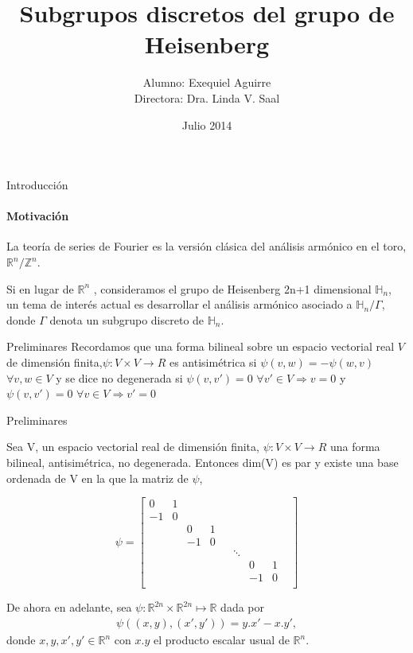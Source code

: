 \documentclass{beamer}
\author{Alumno: Exequiel Aguirre \\ Directora: Dra. Linda V. Saal}
\title{Subgrupos discretos del grupo de Heisenberg }
\date{Julio 2014}
\begin{document}
\maketitle


\begin{frame}{Introducción}
\framesubtitle{Motivación}
La teoría de series de Fourier es la versión clásica del análisis armónico en el toro,
$\mathbb{R}^n /\mathbb{Z}^n$.

Si en lugar de $\mathbb{R}^n$ , consideramos el grupo de Heisenberg 2n+1 dimensional $\mathbb{H}_n$, un tema
de interés actual es desarrollar el análisis armónico asociado a $\mathbb{H}_n/\Gamma$, donde $\Gamma$ 
denota un subgrupo discreto de $\mathbb{H}_n$. 
\end{frame}


\begin{frame}{Preliminares}
Recordamos que una forma bilineal sobre un espacio vectorial real $V$ de dimensión finita,$\psi :V\times V\rightarrow R$
es antisimétrica si $\psi(v,w)=-\psi(w,v)$ $\forall v,w \in V$  y se dice no degenerada si 
$\psi(v,v')=0$ $\forall v' \in V \Rightarrow v = 0$  y 
$\psi(v,v')=0$ $\forall v \in V \Rightarrow v' = 0$
\end{frame}

\begin{frame}{Preliminares}
\begin{theorem} \label{Lang-8.1}
 Sea V, un espacio vectorial real de dimensión finita, $\psi :V\times V\rightarrow R$ una forma bilineal, antisimétrica, no degenerada.
  Entonces dim(V) es par y existe una base ordenada de V en la que la matriz de $\psi$,
 
$$\psi = 
\begin{bmatrix}
 0 & 1 & & & & & & &\\ 
 -1& 0 & & & & & & &\\
 & & 0 & 1 & & & & &\\
 & & -1 & 0 & & & & &\\
 & &  &  & & \ddots & & &\\
 & &  &  & & & 0 & 1 &\\
 & &  &  & & & -1 & 0 &\\ 
\end{bmatrix}
$$
\end{theorem}

De ahora en adelante, sea $\psi :\mathbb{R}^{2n} \times \mathbb{R}^{2n}\mapsto \mathbb{R}$ dada por 
$$ \begin{aligned}
\psi((x,y),(x',y'))=y.x' - x.y' ,
\end{aligned}$$
donde $x,y,x',y' \in \mathbb{R}^n$ con  $x.y$ el producto escalar usual de $\mathbb{R}^n$.
\end{frame}
\end{document}
